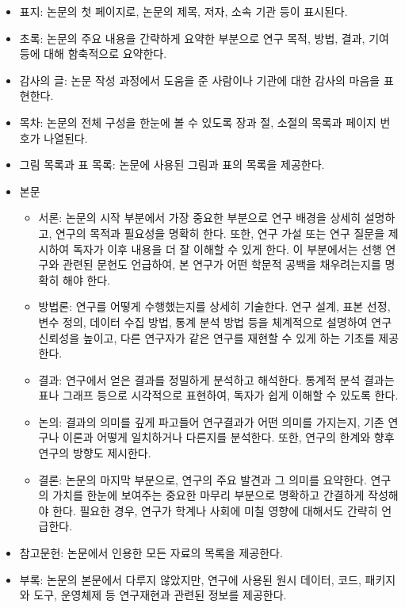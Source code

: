 \documentclass[
  letterpaper,
]{book}
\providecommand{\tightlist}{%
  \setlength{\itemsep}{0pt}\setlength{\parskip}{0pt}}\usepackage{longtable,booktabs,array}
\begin{document}
\begin{itemize}
\tightlist
\item
  표지: 논문의 첫 페이지로, 논문의 제목, 저자, 소속 기관 등이 표시된다.
\item
  초록: 논문의 주요 내용을 간략하게 요약한 부분으로 연구 목적, 방법,
  결과, 기여 등에 대해 함축적으로 요약한다.
\item
  감사의 글: 논문 작성 과정에서 도움을 준 사람이나 기관에 대한 감사의
  마음을 표현한다.
\item
  목차: 논문의 전체 구성을 한눈에 볼 수 있도록 장과 절, 소절의 목록과
  페이지 번호가 나열된다.
\item
  그림 목록과 표 목록: 논문에 사용된 그림과 표의 목록을 제공한다.
\item
  본문

  \begin{itemize}
  \tightlist
  \item
    서론: 논문의 시작 부분에서 가장 중요한 부분으로 연구 배경을 상세히
    설명하고, 연구의 목적과 필요성을 명확히 한다. 또한, 연구 가설 또는
    연구 질문을 제시하여 독자가 이후 내용을 더 잘 이해할 수 있게 한다.
    이 부분에서는 선행 연구와 관련된 문헌도 언급하여, 본 연구가 어떤
    학문적 공백을 채우려는지를 명확히 해야 한다.
  \item
    방법론: 연구를 어떻게 수행했는지를 상세히 기술한다. 연구 설계, 표본
    선정, 변수 정의, 데이터 수집 방법, 통계 분석 방법 등을 체계적으로
    설명하여 연구 신뢰성을 높이고, 다른 연구자가 같은 연구를 재현할 수
    있게 하는 기초를 제공한다.
  \item
    결과: 연구에서 얻은 결과를 정밀하게 분석하고 해석한다. 통계적 분석
    결과는 표나 그래프 등으로 시각적으로 표현하여, 독자가 쉽게 이해할 수
    있도록 한다.
  \item
    논의: 결과의 의미를 깊게 파고들어 연구결과가 어떤 의미를 가지는지,
    기존 연구나 이론과 어떻게 일치하거나 다른지를 분석한다. 또한, 연구의
    한계와 향후 연구의 방향도 제시한다.
  \item
    결론: 논문의 마지막 부분으로, 연구의 주요 발견과 그 의미를 요약한다.
    연구의 가치를 한눈에 보여주는 중요한 마무리 부분으로 명확하고
    간결하게 작성해야 한다. 필요한 경우, 연구가 학계나 사회에 미칠
    영향에 대해서도 간략히 언급한다.
  \end{itemize}
\item
  참고문헌: 논문에서 인용한 모든 자료의 목록을 제공한다.
\item
  부록: 논문의 본문에서 다루지 않았지만, 연구에 사용된 원시 데이터,
  코드, 패키지와 도구, 운영체제 등 연구재현과 관련된 정보를 제공한다.
\end{itemize}
\end{document}
